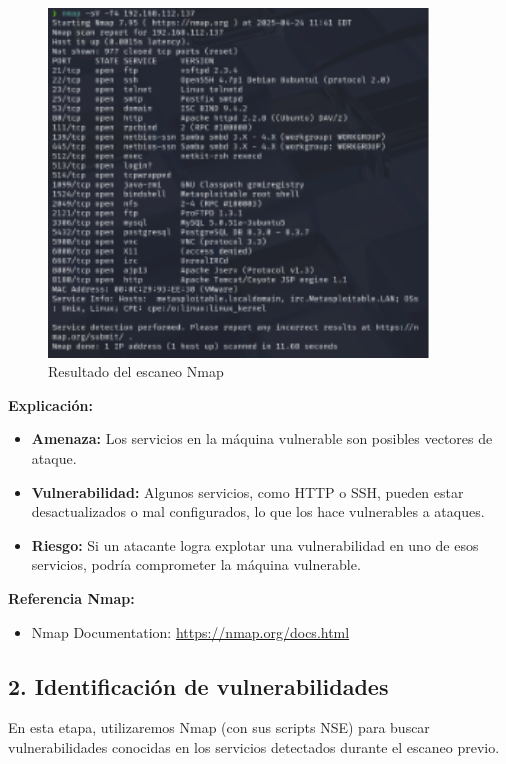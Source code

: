 \documentclass[12pt,a4paper]{article}
\begin{document}
\begin{figure}[H]
    \centering
    \includegraphics[width=0.9\textwidth]{nmap_scan.png}
    \caption{Resultado del escaneo Nmap}
    \label{fig:nmap_scan}
\end{figure}

\textbf{Explicación:}
\begin{itemize}
    \item \textbf{Amenaza:} Los servicios en la máquina vulnerable son posibles vectores de ataque.
    \item \textbf{Vulnerabilidad:} Algunos servicios, como HTTP o SSH, pueden estar desactualizados o mal configurados, lo que los hace vulnerables a ataques.
    \item \textbf{Riesgo:} Si un atacante logra explotar una vulnerabilidad en uno de esos servicios, podría comprometer la máquina vulnerable.
\end{itemize}

\textbf{Referencia Nmap:}
\begin{itemize}
    \item Nmap Documentation: \url{https://nmap.org/docs.html}
\end{itemize}

\subsection{2. Identificación de vulnerabilidades}
En esta etapa, utilizaremos Nmap (con sus scripts NSE) para buscar vulnerabilidades conocidas en los servicios detectados durante el escaneo previo.
\end{document}
